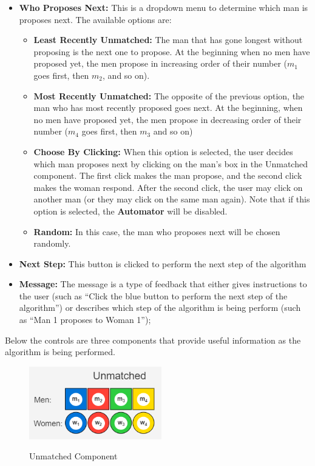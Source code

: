 \begin{itemize}
  \item \textbf{Who Proposes Next:} This is a dropdown menu to determine which 
    man is proposes next. 
    The available options are: 
  \begin{itemize}
    \item \textbf{Least Recently Unmatched:} The man that has gone longest without 
      proposing is the next one to propose. 
      At the beginning when no men have proposed yet, 
      the men propose in increasing order of their number 
    ($m_1$ goes first, then $m_2$, and so on).
    \item \textbf{Most Recently Unmatched:} The opposite of the previous option, 
      the man who has most recently proposed goes next. At the beginning, 
      when no men have proposed yet, the men propose in decreasing order 
      of their number ($m_4$ goes first, then $m_3$ and so on)
    \item \textbf{Choose By Clicking:} When this option is selected, 
      the user decides which man proposes next by clicking on the man's box
      in the Unmatched component.
      The first click makes the man propose, and the second click 
      makes the woman respond. 
      After the second click, the user may click on another man
      (or they may click on the same man again). 
      \subitem Note that if this option is selected, the \textbf{Automator} will be disabled.
    \item \textbf{Random:} In this case, the man who proposes next will be chosen 
      randomly.
  \end{itemize}
  \item \textbf{Next Step:} This button is clicked to perform the next step of 
  the algorithm
  \item \textbf{Message:} The message is a type of feedback that either gives
  instructions to the user 
  (such as ``Click the blue button to perform the next step of the algorithm'')
  or describes which step of the algorithm is being perform 
  (such as ``Man 1 proposes to Woman 1'');
\end{itemize}
Below the controls are three components that
provide useful information as the algorithm is being performed. 
\newline\newline
\begin{figure}[H]
  \caption{Unmatched Component}
  \includegraphics[height=1.25in]
  {images/stable-marriage/unmatched.png}
  \label{fig-unmatched}
  \centering
\end{figure}
